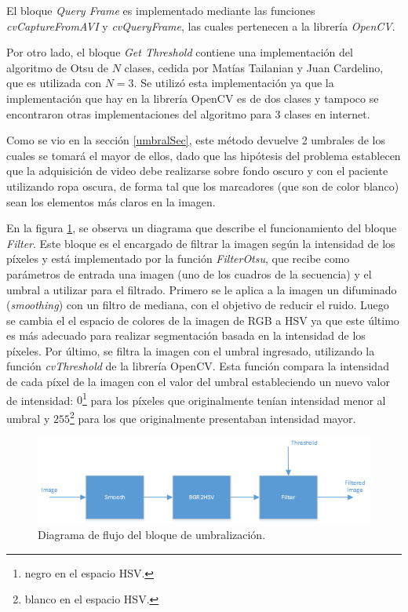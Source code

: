 El bloque \emph{Query Frame} es implementado mediante las funciones \emph{cvCaptureFromAVI} y \emph{cvQueryFrame}, las cuales pertenecen a la librería \emph{OpenCV}\cite{opencv}.


Por otro lado, el bloque \emph{Get Threshold} contiene una implementación del algoritmo de Otsu\cite{otsu} de $N$ clases\cite{implementacionOtsu}, cedida por Matías Tailanian y Juan Cardelino, que es utilizada con $N=3$. Se utilizó esta implementación ya que la implementación que hay en la librería OpenCV\cite{opencv} es de dos clases y tampoco se encontraron otras implementaciones del algoritmo para 3 clases en internet.

 Como se vio en la sección \ref{umbralSec}, este método devuelve 2 umbrales de los cuales se tomará el mayor de ellos, dado que las hipótesis del problema establecen que la adquisición de video debe realizarse sobre fondo oscuro y con el paciente utilizando ropa oscura, de forma tal que los marcadores (que son de color blanco) sean los elementos más claros en la imagen.

En la figura \ref{diagramaumbralizacion}, se observa un diagrama que describe el funcionamiento del bloque \emph{Filter}. Este bloque es el encargado de filtrar la imagen según la intensidad de los píxeles y está implementado por la función \emph{FilterOtsu}, que recibe como parámetros de entrada una imagen (uno de los cuadros de la secuencia) y el umbral a utilizar para el filtrado. Primero se le aplica a la imagen un difuminado (\textit{smoothing}) con un filtro de mediana, con el objetivo de reducir el ruido. Luego se cambia el el espacio de colores de la imagen de RGB a HSV ya que este último es más adecuado para realizar segmentación basada en la intensidad de los píxeles\cite{HSV}. Por último, se filtra la imagen con el umbral ingresado, utilizando la función \emph{cvThreshold} de la librería OpenCV\cite{opencv}. Esta función compara la intensidad de cada píxel de la imagen con el valor del umbral estableciendo un nuevo valor de intensidad: $0$\footnote{negro en el espacio HSV.} para los píxeles que originalmente tenían intensidad menor al umbral y $255$\footnote{blanco en el espacio HSV.} para los que originalmente presentaban intensidad mayor.

\begin{figure}[H]
\begin{center}
\includegraphics[scale=0.7]{img/diagrama_umbralizacion.png}
\end{center}
\caption{Diagrama de flujo del bloque de umbralización.}
\label{diagramaumbralizacion}
\end{figure}

